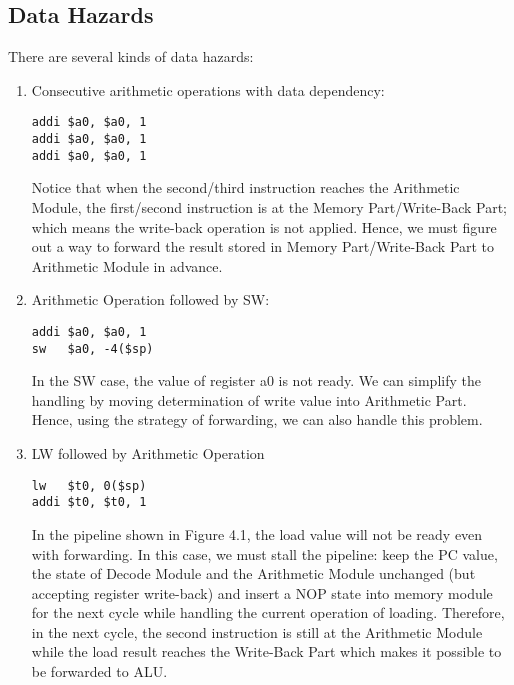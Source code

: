 \subsection{Data Hazards}
There are several kinds of data hazards:
\begin{enumerate}
\item Consecutive arithmetic operations with data dependency:
\begin{verbatim}
addi $a0, $a0, 1
addi $a0, $a0, 1
addi $a0, $a0, 1
\end{verbatim}
Notice that when the second/third instruction reaches the Arithmetic Module, the first/second instruction is at the Memory Part/Write-Back Part; which means the write-back operation is not applied. Hence, we must figure out a way to forward the result stored in Memory Part/Write-Back Part to Arithmetic Module in advance.
\item Arithmetic Operation followed by SW:
\begin{verbatim}
addi $a0, $a0, 1
sw   $a0, -4($sp)
\end{verbatim}
In the SW case, the value of register a0 is not ready. We can simplify the handling by moving determination of write value into Arithmetic Part. Hence, using the strategy of forwarding, we can also handle this problem.

\item LW followed by Arithmetic Operation
\begin{verbatim}
lw   $t0, 0($sp)
addi $t0, $t0, 1
\end{verbatim}
In the pipeline shown in Figure 4.1, the load value will not be ready even with forwarding. In this case, we must stall the pipeline: keep the PC value, the state of Decode Module and the Arithmetic Module unchanged (but accepting register write-back) and insert a NOP state into memory module for the next cycle while handling the current operation of loading. Therefore, in the next cycle, the second instruction is still at the Arithmetic Module while the load result reaches the Write-Back Part which makes it possible to be forwarded to ALU. 
\end{enumerate}

